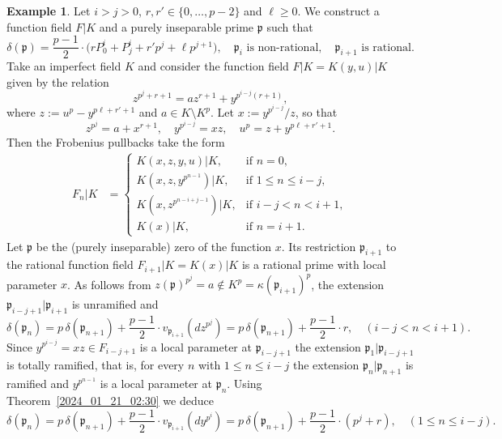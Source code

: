 \documentclass[12pt,reqno]{amsart}%
\theoremstyle{definition}
\newtheorem{example}[prop]{Example}
\theoremstyle{remark}
\newcommand{\pp}{\mathfrak{p}}
\newcommand{\de}{\delta}
\newcommand{\ka}{\kappa}
\begin{document}
\begin{example} \label{2022_07_19_18:55}
Let $i>j>0$, $r,r'\in\{0,\dots,p-2\}$ and $\ell\geq0$.
We construct a function field $F|K$ and a purely inseparable prime $\pp$ such that
\[ \de(\pp) =  \frac{p-1}2 \cdot \big( r P_0^i + P_j^i + r' p^j + \ell p^{j+1} \big), \quad \text{$\pp_i$ is non-rational}, \quad \text{$\pp_{i+1}$ is rational}. \]
Take an imperfect field $K$ and consider the function field $ F|K = K(y,u)|K $
given by the relation
\[ z^{p^j + r + 1} = a z^{r + 1} + y^{p^{i-j} (r+1)}, \]
where $z:= u^p - y^{p\ell+r' +1}$ and $a\in K \setminus K^p$.
Let $x:=y^{p^{i-j}}/z$, so that
\[ z^{p^j} = a + x^{r+1}, \quad y^{p^{i-j}} = xz, \quad u^p = z + y^{p\ell + r' + 1}. \]
Then the Frobenius pullbacks take the form
\begin{align*}
    F_n|K &= 
    \begin{cases}
        K(x,z,y,u)|K, & \text{if $n=0$},\\
        K(x,z,y^{p^{n-1}})|K, & \text{if $1\leq n \leq i-j$},\\
        K(x,z^{p^{n-i+j-1}})|K, & \text{if $i-j < n < i+1$}, \\
        K(x)|K, & \text{if $n=i+1$}.
    \end{cases}
\end{align*}
Let $\pp$ be the (purely inseparable) zero of the function $x$.
Its restriction $\pp_{i+1}$ to the rational function field $F_{i+1}|K = K(x)|K$ is a rational prime with local parameter $x$. 
As follows from $z(\pp)^{p^j} = a \notin K^p = \ka(\pp_{i+1})^p$, 
the extension $\pp_{i-j+1}|\pp_{i+1}$ is unramified and 
\[ \de(\pp_n) = p \, \de(\pp_{n+1}) + \frac{p-1}2 \cdot v_{\pp_{i+1}} (dz^{p^j}) = p \, \de(\pp_{n+1}) + \frac{p-1}2 \cdot r, \quad (i-j < n < i+1). \]
Since $y^{p^{i-j}} = xz \in F_{i-j+1}$ is a local parameter at $\pp_{i-j+1}$ 
the extension $\pp_1|\pp_{i-j+1}$ is totally ramified,
that is, for every $n$ with $1\leq n\leq i-j$ 
the extension $\pp_n|\pp_{n+1}$ is ramified and $y^{p^{n-1}}$ is a local parameter at $\pp_n$. 
Using Theorem~\ref{2024_01_21_02:30} %
we deduce
\[ \de(\pp_n) = p \, \de(\pp_{n+1}) + \frac{p-1}2 \cdot v_{\pp_{i+1}} (dy^{p^{i}}) = p \, \de(\pp_{n+1}) + \frac{p-1}2 \cdot (p^j + r), \quad (1\leq n \leq i-j). \]

\end{example}
\end{document}
